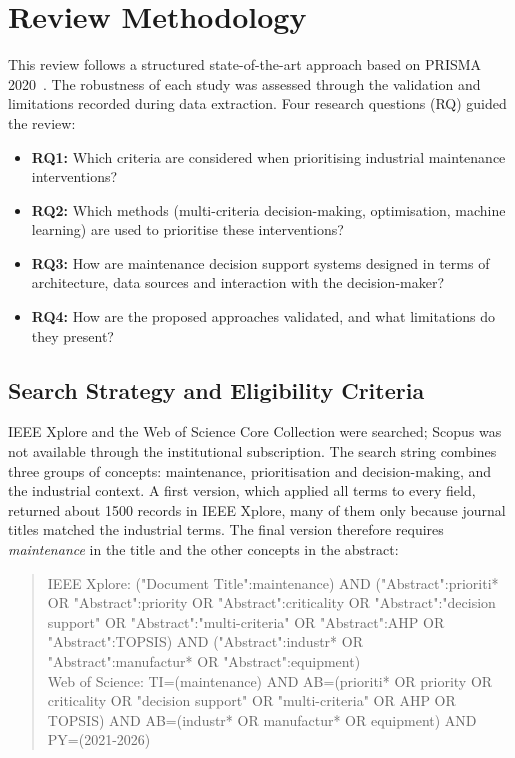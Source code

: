 \section{Review Methodology}
\label{sec:methodology}

This review follows a structured state-of-the-art approach based on PRISMA 2020~\cite{page2021prisma}. The robustness of each study was assessed through the validation and limitations recorded during data extraction. Four research questions (RQ) guided the review:
\begin{itemize}
  \item \textbf{RQ1:} Which criteria are considered when prioritising industrial maintenance interventions?
  \item \textbf{RQ2:} Which methods (multi-criteria decision-making, optimisation, machine learning) are used to prioritise these interventions?
  \item \textbf{RQ3:} How are maintenance decision support systems designed in terms of architecture, data sources and interaction with the decision-maker?
  \item \textbf{RQ4:} How are the proposed approaches validated, and what limitations do they present?
\end{itemize}

\subsection{Search Strategy and Eligibility Criteria}
\label{sec:search}
\label{sec:criteria}

IEEE Xplore and the Web of Science Core Collection were searched; Scopus was not available through the institutional subscription. The search string combines three groups of concepts: maintenance, prioritisation and decision-making, and the industrial context. A first version, which applied all terms to every field, returned about 1500 records in IEEE Xplore, many of them only because journal titles matched the industrial terms. The final version therefore requires \textit{maintenance} in the title and the other concepts in the abstract:

\begin{quote}\scriptsize\ttfamily\raggedright
IEEE Xplore: ("Document Title":maintenance) AND ("Abstract":prioriti* OR "Abstract":priority OR "Abstract":criticality OR "Abstract":"decision support" OR "Abstract":"multi-criteria" OR "Abstract":AHP OR "Abstract":TOPSIS) AND ("Abstract":industr* OR "Abstract":manufactur* OR "Abstract":equipment)\\[3pt]
Web of Science: TI=(maintenance) AND AB=(prioriti* OR priority OR criticality OR "decision support" OR "multi-criteria" OR AHP OR TOPSIS) AND AB=(industr* OR manufactur* OR equipment) AND PY=(2021-2026)
\end{quote}

